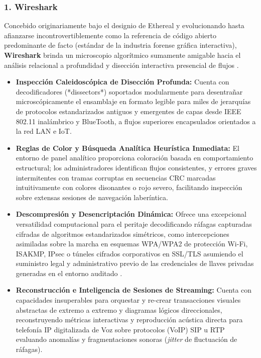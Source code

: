 \documentclass[a4paper,12pt]{article}
\begin{document}
\subsubsection*{1. Wireshark}
Concebido originariamente bajo el designio de Ethereal y evolucionando hasta afianzarse incontrovertiblemente como la referencia de código abierto predominante de facto (estándar de la industria forense gráfica interactiva), \textbf{Wireshark} brinda un microscopio algorítmico sumamente amigable hacia el análisis relacional a profundidad y disección interactiva presencial de flujos \cite{stallings2014}.

\begin{itemize}
    \item \textbf{Inspección Caleidoscópica de Disección Profunda:} Cuenta con decodificadores (*dissectors*) soportados modularmente para desentrañar microscópicamente el ensamblaje en formato legible para miles de jerarquías de protocolos estandarizados antiguos y emergentes de capas desde IEEE 802.11 inalámbrico y BlueTooth, a flujos superiores encapsulados orientados a la red LAN e IoT.
    \item \textbf{Reglas de Color y Búsqueda Analítica Heurística Inmediata:} El entorno de panel analítico proporciona coloración basada en comportamiento estructural; los administradores identifican flujos consistentes, y errores graves intermitentes con tramas corruptas en secuencias CRC marcadas intuitivamente con colores disonantes o rojo severo, facilitando inspección sobre extensas sesiones de navegación laberíntica.
    \item \textbf{Descompresión y Desencriptación Dinámica:} Ofrece una excepcional versatilidad computacional para el peritaje decodificando ráfagas capturadas cifradas de algoritmos estandarizados simétricos, como intercepciones asimiladas sobre la marcha en esquemas WPA/WPA2 de protección Wi-Fi, ISAKMP, IPsec o túneles cifrados corporativos en SSL/TLS asumiendo el suministro legal y administrativo previo de las credenciales de llaves privadas generadas en el entorno auditado \cite{kurose2017}.
    \item \textbf{Reconstrucción e Inteligencia de Sesiones de Streaming:} Cuenta con capacidades insuperables para orquestar y re-crear transacciones visuales abstractas de extremo a extremo y diagramas lógicos direccionales, reconstruyendo métricas interactivas y reproducción acústica directa para telefonía IP digitalizada de Voz sobre protocolos (VoIP) SIP u RTP evaluando anomalías y fragmentaciones sonoras (\textit{jitter} de fluctuación de ráfagas).
\end{itemize}
\end{document}
